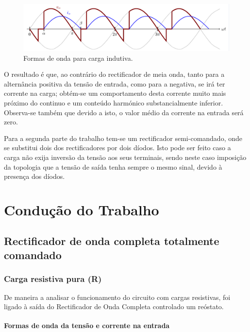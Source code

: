 \documentclass[a4paper,11pt]{article}
\numberwithin{equation}{section}
\begin{document}
\begin{figure}[h]
	\centering
	\includegraphics[keepaspectratio=true, scale=0.8]{img/andamento}
	\caption{Formas de onda para carga indutiva.}
	\label{fig:andamento}
	\vspace{-0.8em}
\end{figure}

O resultado é que, ao contrário do rectificador de meia onda, tanto para a alternância positiva da tensão de entrada, como para a negativa, se irá ter corrente na carga; obtém-se um comportamento desta corrente muito mais próximo do continuo e um conteúdo harmónico substancialmente inferior. Observa-se também que devido a isto, o valor médio da corrente na entrada será zero.

Para a segunda parte do trabalho tem-se um rectificador semi-comandado, onde se substitui dois dos rectificadores por dois díodos. Isto pode ser feito caso a carga não exija inversão da tensão aos seus terminais, sendo neste caso imposição da topologia que a tensão de saída tenha sempre o mesmo sinal, devido à presença dos díodos.


\section{Condução do Trabalho}

\subsection{Rectificador de onda completa totalmente comandado}


\subsubsection{Carga resistiva pura (R)}

De maneira a analisar o funcionamento do circuito com cargas resistivas, foi ligado à saída do Rectificador de Onda Completa controlado um reóstato.


\paragraph{Formas de onda da tensão e corrente na entrada} \mbox{}\
\end{document}
